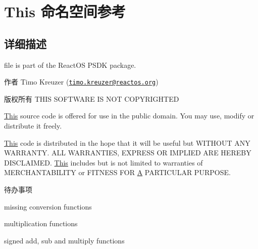 \hypertarget{namespace_this}{}\section{This 命名空间参考}
\label{namespace_this}


\subsection{详细描述}
file is part of the React\+OS P\+S\+DK package.

\begin{DoxyAuthor}{作者}
Timo Kreuzer (\href{mailto:timo.kreuzer@reactos.org}{\tt timo.\+kreuzer@reactos.\+org})
\end{DoxyAuthor}
\begin{DoxyCopyright}{版权所有}
T\+H\+IS S\+O\+F\+T\+W\+A\+RE IS N\+OT C\+O\+P\+Y\+R\+I\+G\+H\+T\+ED
\end{DoxyCopyright}
\hyperlink{namespace_this}{This} source code is offered for use in the public domain. You may use, modify or distribute it freely.

\hyperlink{namespace_this}{This} code is distributed in the hope that it will be useful but W\+I\+T\+H\+O\+UT A\+NY W\+A\+R\+R\+A\+N\+TY. A\+LL W\+A\+R\+R\+A\+N\+T\+I\+ES, E\+X\+P\+R\+E\+SS OR I\+M\+P\+L\+I\+ED A\+RE H\+E\+R\+E\+BY D\+I\+S\+C\+L\+A\+I\+M\+ED. \hyperlink{namespace_this}{This} includes but is not limited to warranties of M\+E\+R\+C\+H\+A\+N\+T\+A\+B\+I\+L\+I\+TY or F\+I\+T\+N\+E\+SS F\+OR \hyperlink{struct_a}{A} P\+A\+R\+T\+I\+C\+U\+L\+AR P\+U\+R\+P\+O\+SE.

\begin{DoxyRefDesc}{待办事项}
\item[\hyperlink{todo__todo000090}{待办事项}]
\begin{DoxyItemize}
\item missing conversion functions
\item multiplication functions
\item signed add, sub and multiply functions 
\end{DoxyItemize}\end{DoxyRefDesc}
